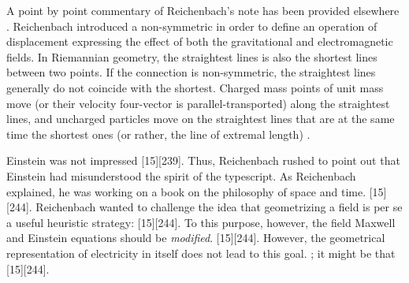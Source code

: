 \documentclass[final]{article}
\begin{document}
A point by point commentary of Reichenbach's note has been provided elsewhere \citep{Giovanelli2016d}. Reichenbach introduced a non-symmetric \Gtmn in order to define an operation of displacement  expressing the effect of both the gravitational and electromagnetic fields. In Riemannian geometry, the straightest lines is also the shortest lines between two points. If the connection is non-symmetric, the straightest lines generally do not coincide with the shortest. Charged mass points of unit mass move (or their velocity four-vector is parallel-transported) along the straightest lines, and uncharged particles move on the straightest lines that are at the same time the shortest ones (or rather, the line of extremal length) \citep{Reichenbach1926f}.

Einstein was not impressed [15][239].  Thus, Reichenbach rushed to point out that Einstein had misunderstood the spirit of the typescript. As Reichenbach explained, he was working on a book on the philosophy of space and time.  [15][244].  Reichenbach wanted to challenge the idea that geometrizing a field is per se a useful heuristic strategy:  [15][244]. To this purpose, however, the field Maxwell and Einstein equations should be \emph{modified}.  [15][244]. However, the geometrical representation of electricity in itself does not lead to this goal. ; it might be that  [15][244]. 
\end{document}
